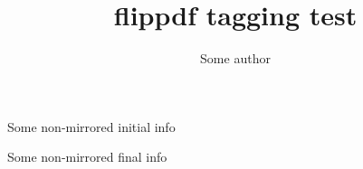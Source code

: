 \documentclass{article}
\title{flippdf tagging test}
\author{Some author}
\begin{document}
\thispagestyle{empty}
{\Large Some non-mirrored initial info}

\bigskip

\kant[1]

\maketitle
\setcounter{page}{1}
\FlipPDF
\kant[2-6]

\clearpage
\UnFlipPDF
\thispagestyle{empty}
{\Large Some non-mirrored final info}

\bigskip

\kant[7]
\end{document}
